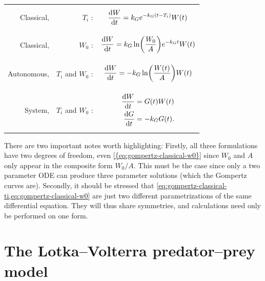 \noindent
\begin{tabularx}{\linewidth}{rrM}
  Classical, & \(T_i\) :&
  \begin{minipage}{\linewidth}
    \begin{equation}
      \diff{W}{t} = k_G e^{-k_G (t - T_i)} W(t) \label{eq:gompertz-classical-ti}
    \end{equation}
  \end{minipage}\tabularnewline
  Classical, & \(W_0\) :&
  \begin{minipage}{\linewidth}
    \begin{equation}
      \diff{W}{t} = k_G \ln(\frac{W_0}{A})e^{-k_G t} W(t) \label{eq:gompertz-classical-w0}
    \end{equation}
  \end{minipage}\tabularnewline
  Autonomous, & \(T_i\) and \(W_0\) :&
  \begin{minipage}{\linewidth}
    \begin{equation}
      \diff{W}{t} = -k_G \ln(\frac{W(t)}{A}) W(t) \label{eq:gompertz-autonomous}
    \end{equation}
  \end{minipage}\tabularnewline
  System, & \(T_i\) and \(W_0\) :&
  \begin{minipage}{\linewidth}%
    {\begin{subequations}\label{eq:gompertz-system}
      \begin{align}
        \diff{W}{t} &= G(t) W(t) \label{eq:gompertz-system-a}\\
        \diff{G}{t} &= -k_G G(t). \label{eq:gompertz-system-b}
      \end{align}
    \end{subequations}}%
  \end{minipage}
\end{tabularx}
There are two important notes worth highlighting:
Firstly, all three formulations have two degrees of freedom, even \cref{{eq:gompertz-classical-w0}} since \(W_0\) and \(A\) only appear in the composite form \(W_0 / A\).
This must be the case since only a two parameter ODE can produce three parameter solutions (which the Gompertz curves are).
Secondly, it should be stressed that \cref{eq:gompertz-classical-ti,eq:gompertz-classical-w0} are just two different parametrizations of the same differential equation.
They will thus share symmetries, and calculations need only be performed on one form.


\section{The Lotka--Volterra predator--prey model}

